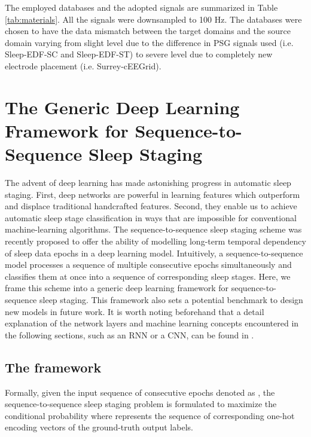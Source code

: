 \documentclass[journal,twoside,web]{ieeecolor}
\begin{document}
The employed databases and the adopted signals are summarized in Table \ref{tab:materials}. All the signals were downsampled to 100 Hz. The databases were chosen to have the data mismatch between the target domains and the source domain varying from slight level due to the difference in PSG signals used (i.e. Sleep-EDF-SC and Sleep-EDF-ST) to severe level due to completely new electrode placement (i.e. Surrey-cEEGrid).


\vspace{-0.15cm}
\section{The Generic Deep Learning Framework for Sequence-to-Sequence Sleep Staging}
\label{sec:models}

The advent of deep learning has made astonishing progress in automatic sleep staging. First, deep networks are powerful in learning features which outperform and displace traditional handcrafted features. Second, they enable us to achieve automatic sleep stage classification in ways that are impossible for conventional machine-learning algorithms. The sequence-to-sequence sleep staging scheme \cite{Phan2019a} was recently proposed to offer the ability of modelling long-term temporal dependency of sleep data epochs in a deep learning model. Intuitively, a sequence-to-sequence model processes a sequence of multiple consecutive epochs simultaneously and classifies them at once into a sequence of corresponding sleep stages. Here, we frame this scheme into a generic deep learning framework for sequence-to-sequence sleep staging. This framework also sets a potential benchmark to design new models in future work. It is worth noting beforehand that a detail explanation of the network layers and machine learning concepts encountered in the following sections, such as an RNN or a CNN, can be found in \cite{Goodfellow2016}.

\vspace{-0.2cm}
\subsection{The framework}
\label{sec:framework}

Formally, given the input sequence of  consecutive epochs denoted as , the sequence-to-sequence sleep staging problem \cite{Phan2019a} is formulated to maximize the conditional probability 
 where  represents the sequence of corresponding  one-hot encoding vectors of the ground-truth output labels.
\end{document}
